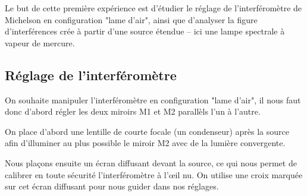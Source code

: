 \documentclass{article}
\begin{document}
Le but de cette première expérience est d'étudier le réglage de l'interféromètre de Michelson 
en configuration "lame d'air", ainsi que d'analyser la figure d'interférences crée à partir d'une source étendue 
– ici une lampe spectrale à vapeur de mercure. 

\subsection{Réglage de l'interféromètre}


On souhaite manipuler l'interféromètre en configuration "lame d'air", il nous faut donc d'abord régler 
les deux miroirs M1 et M2 parallèls l'un à l'autre.

On place d'abord une lentille de courte focale (un condenseur) après la source afin d'illuminer au plus possible 
le miroir M2 avec de la lumière convergente.

Nous plaçons ensuite un écran diffusant devant la source, ce qui nous permet de calibrer en 
toute sécurité l'interféromètre à l'œil nu. On utilise une croix marquée sur cet écran diffusant 
pour nous guider dans nos réglages.
\end{document}
